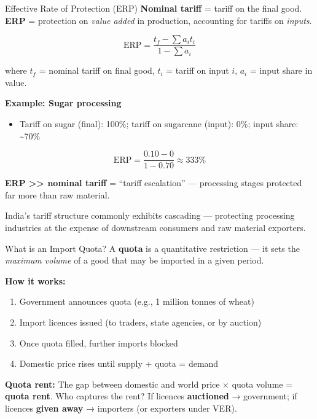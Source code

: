 \documentclass[
  ignorenonframetext,
  aspectratio=169,
]{beamer}
\makeatletter
\providecommand{\tightlist}{%
  \setlength{\itemsep}{0pt}\setlength{\parskip}{0pt}}
\let\quarto@originallabel\label
\DeclareRobustCommand*{\label}[1]{\quarto@originallabel{#1}}
\makeatother
\begin{document}
\begin{frame}{Effective Rate of Protection (ERP)}
\label{effective-rate-of-protection-erp}
\textbf{Nominal tariff} = tariff on the final good. \textbf{ERP} =
protection on \emph{value added} in production, accounting for tariffs
on \emph{inputs}.

\[\text{ERP} = \frac{t_f - \sum a_i t_i}{1 - \sum a_i}\]

where \(t_f\) = nominal tariff on final good, \(t_i\) = tariff on input
\(i\), \(a_i\) = input share in value.

\textbf{Example: Sugar processing}

\begin{itemize}
\tightlist
\item
  Tariff on sugar (final): 100\%; tariff on sugarcane (input): 0\%;
  input share: \textasciitilde70\%
\end{itemize}

\[\text{ERP} = \frac{0.10 - 0}{1 - 0.70} \approx 333\%\]

\textbf{ERP \textgreater\textgreater{} nominal tariff} = ``tariff
escalation'' --- processing stages protected far more than raw material.

India's tariff structure commonly exhibits cascading --- protecting
processing industries at the expense of downstream consumers and raw
material exporters.
\end{frame}

\begin{frame}{What is an Import Quota?}
\label{what-is-an-import-quota}
A \textbf{quota} is a quantitative restriction --- it sets the
\emph{maximum volume} of a good that may be imported in a given period.

\textbf{How it works:}

\begin{enumerate}
\tightlist
\item
  Government announces quota (e.g., 1 million tonnes of wheat)
\item
  Import licences issued (to traders, state agencies, or by auction)
\item
  Once quota filled, further imports blocked
\item
  Domestic price rises until supply + quota = demand
\end{enumerate}

\textbf{Quota rent:} The gap between domestic and world price × quota
volume = \textbf{quota rent}. Who captures the rent? If licences
\textbf{auctioned} → government; if licences \textbf{given away} →
importers (or exporters under VER).
\end{frame}
\end{document}
